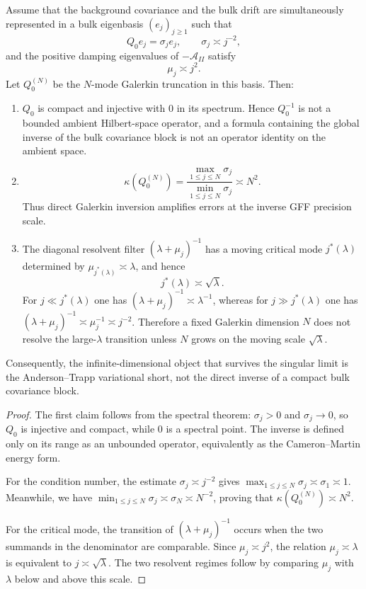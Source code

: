 \begin{lemma}
\label{lem:gff_spectral_obstruction_appendix}
Assume that the background covariance and the bulk drift are simultaneously
represented in a bulk eigenbasis $(e_j)_{j\ge1}$ such that
\[
  Q_0e_j=\sigma_je_j,
  \qquad
  \sigma_j\asymp j^{-2},
\]
and the positive damping eigenvalues of $-\mathcal{A}_{II}$ satisfy
\[
  \mu_j\asymp j^2 .
\]
Let $Q_0^{(N)}$ be the $N$-mode Galerkin truncation in this basis.  Then:
\begin{enumerate}[label=(\roman*)]
\item $Q_0$ is compact and injective with $0$ in its spectrum.  Hence
$Q_0^{-1}$ is not a bounded ambient Hilbert-space operator, and a formula
containing the global inverse of the bulk covariance block is not an operator
identity on the ambient space.
\item
\[
  \kappa(Q_0^{(N)})
  =
  \frac{\max_{1\le j\le N}\sigma_j}{\min_{1\le j\le N}\sigma_j}
  \asymp N^2 .
\]
Thus direct Galerkin inversion amplifies errors at the inverse GFF precision
scale.
\item The diagonal resolvent filter $(\lambda+\mu_j)^{-1}$ has a moving critical
mode $j^*(\lambda)$ determined by $\mu_{j^*(\lambda)}\asymp\lambda$, and hence
\[
  j^*(\lambda)\asymp\sqrt{\lambda}.
\]
For $j\ll j^*(\lambda)$ one has
$(\lambda+\mu_j)^{-1}\asymp\lambda^{-1}$, whereas for
$j\gg j^*(\lambda)$ one has
$(\lambda+\mu_j)^{-1}\asymp\mu_j^{-1}\asymp j^{-2}$.  Therefore a fixed
Galerkin dimension $N$ does not resolve the large-$\lambda$ transition unless
$N$ grows on the moving scale $\sqrt{\lambda}$.
\end{enumerate}
Consequently, the infinite-dimensional object that survives the singular limit
is the Anderson--Trapp variational short, not the direct inverse of a compact
bulk covariance block.
\end{lemma}

\begin{proof}
The first claim follows from the spectral theorem: $\sigma_j>0$ and
$\sigma_j\to0$, so $Q_0$ is injective and compact, while $0$ is a spectral point.
The inverse is defined only on its range as an unbounded operator, equivalently
as the Cameron--Martin energy form.

For the condition number, the estimate $\sigma_j\asymp j^{-2}$ gives
$\max_{1\le j\le N}\sigma_j\asymp\sigma_1\asymp1$. Meanwhile, we have
$\min_{1\le j\le N}\sigma_j\asymp\sigma_N\asymp N^{-2}$, proving that
$\kappa(Q_0^{(N)})\asymp N^2$.

For the critical mode, the transition of $(\lambda+\mu_j)^{-1}$ occurs when the
two summands in the denominator are comparable.  Since $\mu_j\asymp j^2$, the
relation $\mu_j\asymp\lambda$ is equivalent to $j\asymp\sqrt{\lambda}$.  The two
resolvent regimes follow by comparing $\mu_j$ with $\lambda$ below and above this
scale.
\end{proof}

